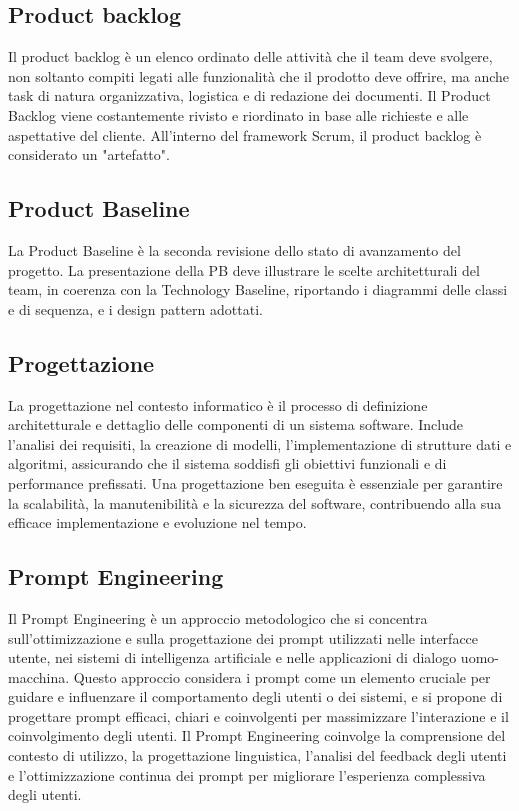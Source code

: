 \vspace{2em}
\subsection*{Product backlog}
Il product backlog è un elenco ordinato delle attività che il team deve svolgere, non soltanto compiti legati alle funzionalità che il prodotto deve offrire, ma anche task di natura organizzativa, logistica e di redazione dei documenti. Il Product Backlog viene costantemente rivisto e riordinato in base alle richieste e alle aspettative del cliente. All’interno del framework Scrum, il product backlog è considerato un "artefatto".

\vspace{2em}
\subsection*{Product Baseline}
La Product Baseline è la seconda revisione dello stato di avanzamento del progetto. La presentazione della PB deve illustrare le scelte architetturali del team, in coerenza con la Technology Baseline, riportando i diagrammi delle classi e di sequenza, e i design pattern adottati.

\vspace{2em}
\subsection*{Progettazione}
La progettazione nel contesto informatico è il processo di definizione architetturale e dettaglio delle componenti di un sistema software. Include l'analisi dei requisiti, la creazione di modelli, l'implementazione di strutture dati e algoritmi, assicurando che il sistema soddisfi gli obiettivi funzionali e di performance prefissati. Una progettazione ben eseguita è essenziale per garantire la scalabilità, la manutenibilità e la sicurezza del software, contribuendo alla sua efficace implementazione e evoluzione nel tempo.

\vspace{2em}
\subsection*{Prompt Engineering}
Il Prompt Engineering è un approccio metodologico che si concentra sull'ottimizzazione e sulla progettazione dei prompt utilizzati nelle interfacce utente, nei sistemi di intelligenza artificiale e nelle applicazioni di dialogo uomo-macchina. Questo approccio considera i prompt come un elemento cruciale per guidare e influenzare il comportamento degli utenti o dei sistemi, e si propone di progettare prompt efficaci, chiari e coinvolgenti per massimizzare l'interazione e il coinvolgimento degli utenti. Il Prompt Engineering coinvolge la comprensione del contesto di utilizzo, la progettazione linguistica, l'analisi del feedback degli utenti e l'ottimizzazione continua dei prompt per migliorare l'esperienza complessiva degli utenti.

